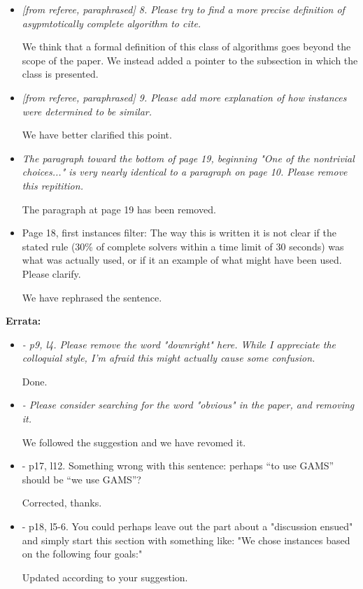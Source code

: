 \documentclass[11pt]{article}
\newcommand{\rep}[1]{{\textcolor{acblue}{#1}}}
\begin{document}
\begin{itemize}
\item 
{\it
[from referee, paraphrased] 8. Please try to find a more precise definition of asypmtotically complete algorithm to 
cite.
} 

\rep{We think that a formal definition of this class of algorithms goes beyond the scope of the paper. We instead added a pointer to the subsection in which the class is presented.}

\item 
{\it
[from referee, paraphrased] 9. Please add more explanation of how instances were determined to be similar. 
}

\rep{We have better clarified this point.}


\item 
{\it
The paragraph toward the bottom of page 19, beginning "One of the nontrivial choices..." is very nearly identical to a paragraph on page 10. Please remove this repitition. 
}

\rep{The paragraph at page 19 has been removed.}


\item Page 18, first instances filter: The way this is written it is not clear if the stated rule (30\% of complete solvers within a time limit of 30 seconds) was what was actually used, or if it an example of what might have been used. Please clarify. 

\rep{We have rephrased the sentence.}

 
\end{itemize}

\bigskip
\textbf{Errata:}

 \begin{itemize}
 
\item 
{\it
- p9, l4. Please remove the word "downright" here. While I appreciate the colloquial style, I'm afraid this might actually cause some confusion. 
}

\rep{Done.}

\item 
{\it
- Please consider searching for the word "obvious" in the paper, and removing it. 
}

\rep{We followed the suggestion and we have revomed it.}

\item 
{\it

- p17, l12. Something wrong with this sentence: perhaps ``to use GAMS'' should be ``we use GAMS''? 
}

\rep{Corrected, thanks.}

\item 
{\it

- p18, l5-6. You could perhaps leave out the part about a "discussion ensued" and simply start this section with something like: "We chose instances based on the following four goals:" 
}

\rep{Updated according to your suggestion.}

 
\end{itemize}
\end{document}
